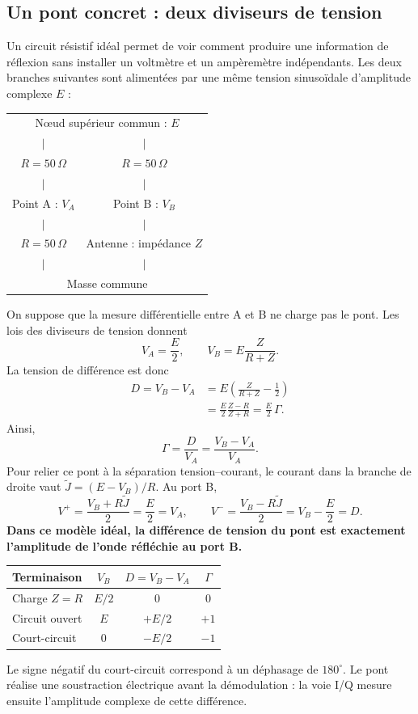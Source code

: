 \documentclass[11pt,a4paper]{article}
\begin{document}
\subsection{Un pont concret : deux diviseurs de tension}
Un circuit résistif idéal permet de voir comment produire une information
de réflexion sans installer un voltmètre et un ampèremètre indépendants.
Les deux branches suivantes sont alimentées par une même tension
sinusoïdale d'amplitude complexe $E$ :
\begin{center}
\begin{tabular}{c@{\qquad\qquad}c}
\multicolumn{2}{c}{N\oe ud supérieur commun : $E$}\\
$|$ & $|$\\
$R=50\,\Omega$ & $R=50\,\Omega$\\
$|$ & $|$\\
Point A : $V_A$ & Point B : $V_B$\\
$|$ & $|$\\
$R=50\,\Omega$ & Antenne : impédance $Z$\\
$|$ & $|$\\
\multicolumn{2}{c}{Masse commune}
\end{tabular}
\end{center}
On suppose que la mesure différentielle entre A et B ne charge pas le
pont. Les lois des diviseurs de tension donnent
\begin{equation}
 V_A=\frac E2,\qquad V_B=E\frac{Z}{R+Z}.
\end{equation}
La tension de différence est donc
\begin{align}
 D=V_B-V_A
 &=E\left(\frac{Z}{R+Z}-\frac12\right)\\
 &=\frac E2\frac{Z-R}{Z+R}=\frac E2\,\Gamma.
\end{align}
Ainsi,
\begin{equation}
 \boxed{\Gamma=\frac{D}{V_A}=\frac{V_B-V_A}{V_A}.}
\end{equation}
Pour relier ce pont à la séparation tension--courant, le courant dans la
branche de droite vaut $\widetilde J=(E-V_B)/R$. Au port B,
\begin{equation}
 V^+=\frac{V_B+R\widetilde J}{2}=\frac E2=V_A,
 \qquad
 V^-=\frac{V_B-R\widetilde J}{2}=V_B-\frac E2=D.
\end{equation}
\textbf{Dans ce modèle idéal, la différence de tension du pont est
exactement l'amplitude de l'onde réfléchie au port B.}

\begin{center}
\begin{tabular}{lccc}
\toprule
Terminaison & $V_B$ & $D=V_B-V_A$ & $\Gamma$\\
\midrule
Charge $Z=R$ & $E/2$ & $0$ & $0$\\
Circuit ouvert & $E$ & $+E/2$ & $+1$\\
Court-circuit & $0$ & $-E/2$ & $-1$\\
\bottomrule
\end{tabular}
\end{center}
Le signe négatif du court-circuit correspond à un déphasage de $180^\circ$.
Le pont réalise une soustraction électrique avant la démodulation : la
voie I/Q mesure ensuite l'amplitude complexe de cette différence.
\end{document}
